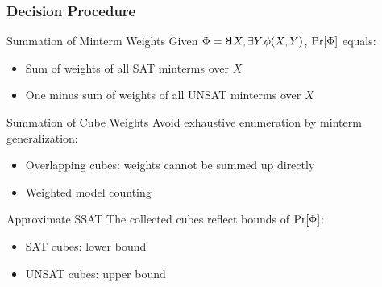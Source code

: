\begin{frame}
    \frametitle{Decision Procedure}
    \begin{block}{Summation of Minterm Weights}
        Given $\Qf=\random{} X,\exists Y.\pf(X,Y)$, $\Pr[\Phi]$ equals:
        \pause
        \begin{itemize}
            \item Sum of weights of all SAT minterms over $X$
                  \pause
            \item One minus sum of weights of all UNSAT minterms over $X$
                  \pause
        \end{itemize}
    \end{block}
    \begin{block}{Summation of Cube Weights}
        Avoid exhaustive enumeration by minterm generalization:
        \pause
        \begin{itemize}
            \item Overlapping cubes: weights cannot be summed up directly
                  \pause
            \item Weighted model counting
                  \pause
        \end{itemize}
    \end{block}
    \begin{block}{Approximate SSAT}
        The collected cubes reflect bounds of $\Pr[\Phi]$:
        \pause
        \begin{itemize}
            \item SAT cubes: lower bound
                  \pause
            \item UNSAT cubes: upper bound
        \end{itemize}
    \end{block}
\end{frame}

